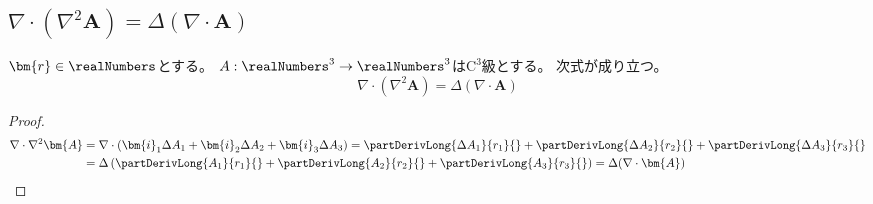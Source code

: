         \subsection{\texorpdfstring{$\nabla\cdot(\nabla^2\bm{A}) = \Delta(\nabla\cdot\bm{A})$}{ベクトルLaplacianの発散}}
            \label{ベクトルLaplacianの発散}
            \begin{shadebox}
                $\bm{r}\in\realNumbers$とする。
                $A: \realNumbers^3\to\realNumbers^3$は$\mathrm{C}^3$級とする。
                次式が成り立つ。
                \[ \nabla\cdot(\nabla^2\bm{A}) = \Delta(\nabla\cdot\bm{A}) \]
            \end{shadebox}
            \begin{proof}
                \begin{align*}
                    \nabla\cdot\nabla^2\bm{A} &= \nabla\cdot\left(\bm{i}_1 \Delta A_1 + \bm{i}_2 \Delta A_2 + \bm{i}_3 \Delta A_3\right) = \partDerivLong{\Delta A_1}{r_1}{} + \partDerivLong{\Delta A_2}{r_2}{} + \partDerivLong{\Delta A_3}{r_3}{} \\
                    &= \Delta\left(\partDerivLong{A_1}{r_1}{} + \partDerivLong{A_2}{r_2}{} + \partDerivLong{A_3}{r_3}{}\right) = \Delta(\nabla\cdot\bm{A})
                \end{align*}
            \end{proof}
